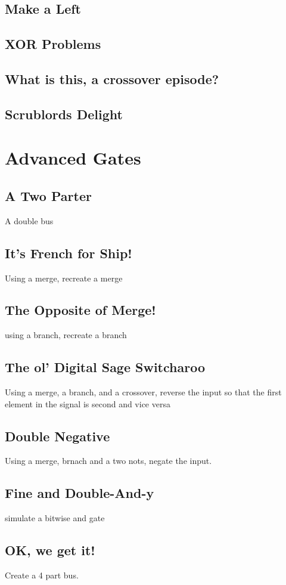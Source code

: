 ﻿\documentclass[a4paper, 12pt]{article}
\begin{document}
\subsection{Make a Left}
\subsection{XOR Problems}
\subsection{What is this, a crossover episode?}
\subsection{Scrublords Delight}

\section{Advanced Gates}

\subsection{A Two Parter}
A double bus
\subsection{It's French for Ship!}
Using a merge, recreate a merge
\subsection{The Opposite of Merge!}
using a branch, recreate a branch
\subsection{The ol' Digital Sage Switcharoo}
Using a merge, a branch, and a crossover, reverse the input so that the first element in the signal is second and vice versa
\subsection{Double Negative}
Using a merge, brnach and a two nots, negate the input.
\subsection{Fine and Double-And-y}
simulate a bitwise and gate
\subsection{OK, we get it!}
Create a 4 part bus.
\end{document}
